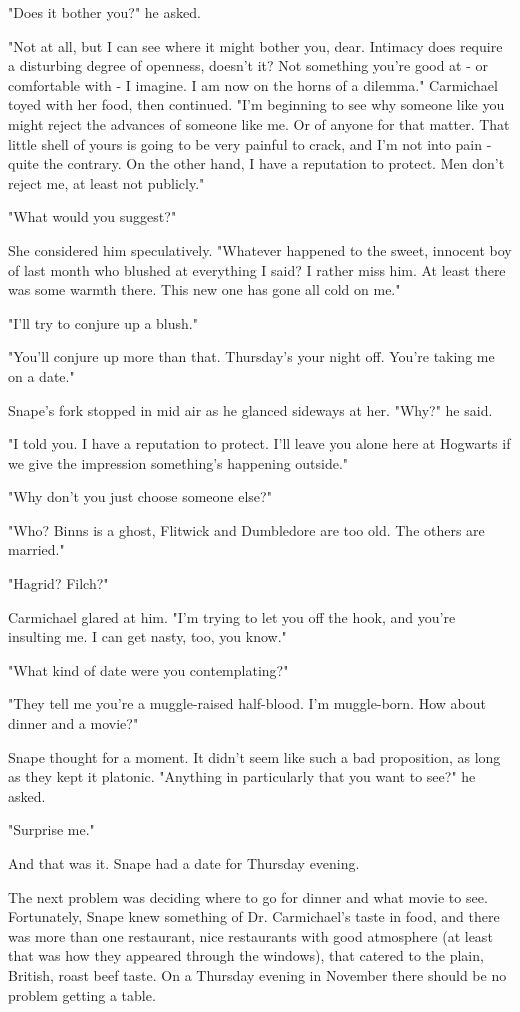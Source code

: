 "Does it bother you?" he asked.

"Not at all, but I can see where it might bother you, dear. Intimacy does require a disturbing degree of{\el} openness, doesn't it? Not something you're good at - or comfortable with - I imagine. I am now on the horns of a dilemma." Carmichael toyed with her food, then continued. "I'm beginning to see why someone like you might reject the advances of someone like me. Or of anyone for that matter. That little shell of yours is going to be very painful to crack, and I'm not into pain - quite the contrary. On the other hand, I have a reputation to protect. Men don't reject me, at least not publicly."

"What would you suggest?"

She considered him speculatively. "Whatever happened to the sweet, innocent boy of last month who blushed at everything I said? I rather miss him. At least there was some warmth there. This new one has gone all cold on me."

"I'll try to conjure up a blush."

"You'll conjure up more than that. Thursday's your night off. You're taking me on a date."

Snape's fork stopped in mid air as he glanced sideways at her. "Why?" he said.

"I told you. I have a reputation to protect. I'll leave you alone here at Hogwarts if we give the impression something's happening outside."

"Why don't you just choose someone else?"

"Who? Binns is a ghost, Flitwick and Dumbledore are too old. The others are married."

"Hagrid? Filch?"

Carmichael glared at him. "I'm trying to let you off the hook, and you're insulting me. I can get nasty, too, you know."

"What kind of date were you contemplating?"

"They tell me you're a muggle-raised half-blood. I'm muggle-born. How about dinner and a movie?"

Snape thought for a moment. It didn't seem like such a bad proposition, as long as they kept it platonic. "Anything in particularly that you want to see?" he asked.

"Surprise me."

And that was it. Snape had a date for Thursday evening.

The next problem was deciding where to go for dinner and what movie to see. Fortunately, Snape knew something of Dr. Carmichael's taste in food, and there was more than one restaurant, nice restaurants with good atmosphere (at least that was how they appeared through the windows), that catered to the plain, British, roast beef taste. On a Thursday evening in November there should be no problem getting a table.

